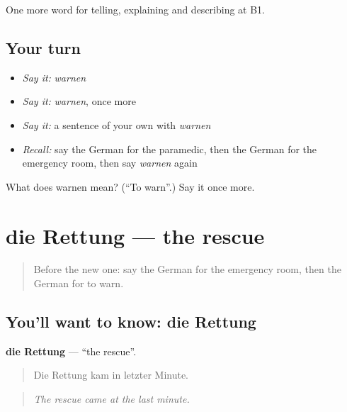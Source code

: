 \begin{grammarlens}[title={What you've built}]
One more word for telling, explaining and describing at B1.
\end{grammarlens}

\subsection*{Your turn}
\begin{itemize}
\raggedright
  \item \emph{Say it:} \emph{warnen}
  \item \emph{Say it:} \emph{warnen}, once more
  \item \emph{Say it:} a sentence of your own with \emph{warnen}
  \item \emph{Recall:} say the German for the paramedic, then the German for the emergency room, then say \emph{warnen} again
\end{itemize}

\begin{tcolorbox}[breakable,colback=teal!4,colframe=teal!35!black,title={Before you move on}]
What does warnen mean? (\textquotedblleft{}To warn\textquotedblright{}.) Say it once more.
\end{tcolorbox}
\section[die Rettung]{die Rettung — the rescue}

\label{lesson:GE-C292-rettung}



\begin{quote}
Before the new one: say the German for the emergency room, then the German for to warn.
\end{quote}

\subsection*{You'll want to know: die Rettung}
\textbf{die Rettung} — \textquotedblleft{}the rescue\textquotedblright{}.

\begin{quote}
Die Rettung kam in letzter Minute.
\end{quote}

\begin{quote}
\emph{The rescue came at the last minute.}
\end{quote}

